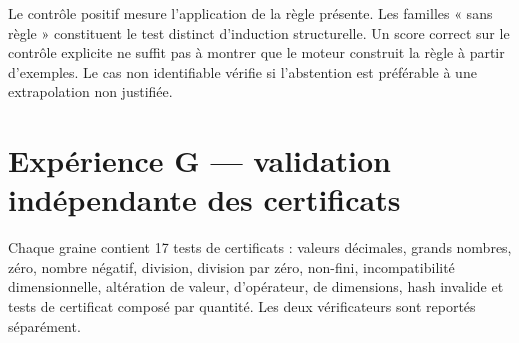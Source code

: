 \documentclass[11pt,a4paper]{article}
\begin{document}
Le contrôle positif mesure l’application de la règle présente. Les familles « sans règle » constituent le test distinct d’induction structurelle. Un score correct sur le contrôle explicite ne suffit pas à montrer que le moteur construit la règle à partir d’exemples. Le cas non identifiable vérifie si l’abstention est préférable à une extrapolation non justifiée.

\section{Expérience G — validation indépendante des certificats}

Chaque graine contient 17 tests de certificats : valeurs décimales, grands nombres, zéro, nombre négatif, division, division par zéro, non-fini, incompatibilité dimensionnelle, altération de valeur, d’opérateur, de dimensions, hash invalide et tests de certificat composé par quantité. Les deux vérificateurs sont reportés séparément.
\end{document}
